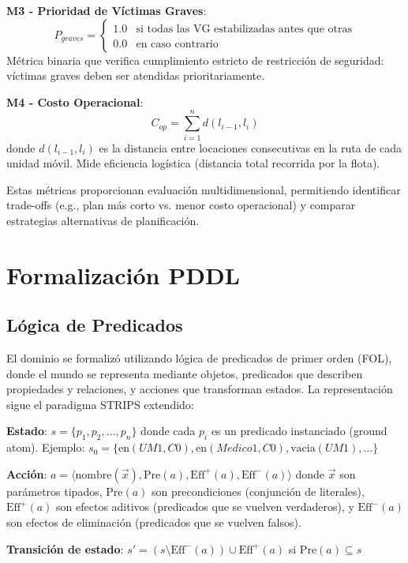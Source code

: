 \documentclass[conference]{IEEEtran}
\begin{document}
    \textbf{M3 - Prioridad de Víctimas Graves}:
    \[
    P_{graves} = \begin{cases}
    1.0 & \text{si todas las VG estabilizadas antes que otras} \\
    0.0 & \text{en caso contrario}
    \end{cases}
    \]
    Métrica binaria que verifica cumplimiento estricto de restricción de seguridad: víctimas graves deben ser atendidas prioritariamente.

    \textbf{M4 - Costo Operacional}:
    \[
    C_{op} = \sum_{i=1}^{n} d(l_{i-1}, l_i)
    \]
    donde $d(l_{i-1}, l_i)$ es la distancia entre locaciones consecutivas en la ruta de cada unidad móvil. Mide eficiencia logística (distancia total recorrida por la flota).

    Estas métricas proporcionan evaluación multidimensional, permitiendo identificar trade-offs (e.g., plan más corto vs. menor costo operacional) y comparar estrategias alternativas de planificación.

    \section{Formalización PDDL}

    \subsection{Lógica de Predicados}

    El dominio se formalizó utilizando lógica de predicados de primer orden (FOL), donde el mundo se representa mediante objetos, predicados que describen propiedades y relaciones, y acciones que transforman estados. La representación sigue el paradigma STRIPS extendido:

    \textbf{Estado}: $s = \{p_1, p_2, \ldots, p_n\}$ donde cada $p_i$ es un predicado instanciado (ground atom). Ejemplo: $s_0 = \{\text{en}(UM1, C0), \text{en}(Medico1, C0), \text{vacia}(UM1), \ldots\}$

    \textbf{Acción}: $a = \langle \text{nombre}(\vec{x}), \text{Pre}(a), \text{Eff}^+(a), \text{Eff}^-(a) \rangle$ donde $\vec{x}$ son parámetros tipados, $\text{Pre}(a)$ son precondiciones (conjunción de literales), $\text{Eff}^+(a)$ son efectos aditivos (predicados que se vuelven verdaderos), y $\text{Eff}^-(a)$ son efectos de eliminación (predicados que se vuelven falsos).

    \textbf{Transición de estado}: $s' = (s \setminus \text{Eff}^-(a)) \cup \text{Eff}^+(a)$ si $\text{Pre}(a) \subseteq s$
\end{document}
